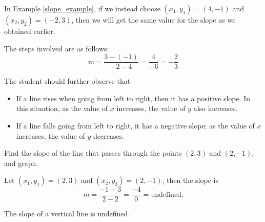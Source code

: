 In Example \ref{slope_example}, if we instead choose \((x_1, y_1) = (4, -1)\) and \((x_2, y_2) = (-2, 3)\), then we will get the same value for the slope as we obtained earlier.

The steps involved are as follows:
\[
\text{m} = \frac{3 - (-1)}{-2 - 4} = \frac{4}{-6} = -\frac{2}{3}
\]

The student should further observe that
\begin{itemize}
    \item If a line rises when going from left to right, then it has a positive slope. In this situation, as the value of $x$ increases, the value of $y$ also increases.
    \item If a line falls going from left to right, it has a negative slope; as the value of $x$ increases, the value of $y$ decreases.
\end{itemize}

\begin{example}
Find the slope of the line that passes through the points $(2, 3)$ and $(2, -1)$, and graph.
\end{example}

\begin{solution} Let $(x_1, y_1) = (2, 3)$ and $(x_2, y_2) = (2, -1)$, then the slope is
\[ m = \frac{-1 - 3}{2 - 2} = \frac{-4}{0} = \text{undefined}.\]

\begin{center}
\end{center}

\end{solution}
\begin{note}
The slope of a vertical line is undefined.
\end{note}

